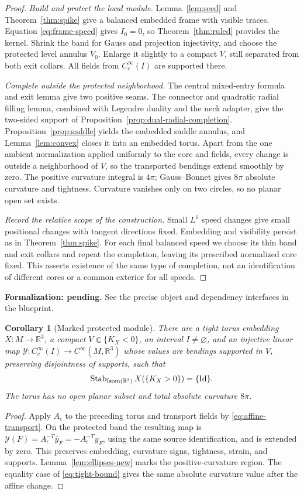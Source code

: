 \documentclass[11pt]{amsart}
\newtheorem{corollary}[theorem]{Corollary}
\theoremstyle{definition}
\theoremstyle{remark}
\newcommand{\R}{\mathbb R}\newcommand{\Sph}{\mathbb S}
\DeclareMathOperator{\Isom}{Isom}\DeclareMathOperator{\Emb}{Emb}
\numberwithin{equation}{section}
\begin{document}
\begin{proof}
\emph{Build and protect the local module.}
Lemma~\ref{lem:seed} and Theorem~\ref{thm:spike} give a balanced embedded
frame with visible traces. Equation \eqref{eq:frame-speed} gives $I_0=0$,
so Theorem~\ref{thm:ruled} provides the kernel. Shrink the band for Gauss
and projection injectivity, and choose the protected level annulus $V_0$.
Enlarge it slightly to a compact $V$, still separated from both exit
collars. All fields from $C_c^\infty(I)$ are supported there.

\emph{Complete outside the protected neighborhood.}
The central mixed-entry formula and exit lemma give two positive seams.
The connector and quadratic radial filling lemma, combined with
Legendre duality and the neck adapter, give the two-sided support
of Proposition~\ref{prop:dual-radial-completion}.
Proposition~\ref{prop:saddle} yields the embedded saddle annulus, and
Lemma~\ref{lem:convex} closes it into an embedded torus. Apart from the
one ambient normalization applied uniformly to the core and fields,
every change is outside a neighborhood of $V$, so the transported
bendings extend smoothly by zero.
The positive curvature integral is $4\pi$; Gauss--Bonnet gives $8\pi$
absolute curvature and tightness. Curvature vanishes only on two circles,
so no planar open set exists.

\emph{Record the relative scope of the construction.}
Small $L^1$ speed changes give small positional changes with tangent
directions fixed. Embedding and visibility persist as in
Theorem~\ref{thm:spike}. For each final balanced speed we choose its thin
band and exit collars and repeat the completion, leaving its prescribed
normalized core fixed. This asserts existence of the same type of completion, not
an identification of different cores or a common exterior for all speeds.
\end{proof}

\par\noindent\textbf{Formalization: pending.} See the precise object and dependency interfaces in the blueprint.\par
\begin{corollary}[Marked protected module]\label{cor:marked-module}
There are a tight torus embedding $X:M\to\R^3$, a compact
$V\Subset\{K_X<0\}$, an interval $I\ne\varnothing$, and an injective
linear map $\mathcal Y:C_c^\infty(I)\to C^\infty(M,\R^3)$ whose values
are bendings supported in $V$, preserving disjointness of supports, such
that
\[
 \Stab_{\Isom(\R^3)}X(\{K_X>0\})=\{\Id\}.
\]
The torus has no open planar subset and total absolute curvature $8\pi$.
\end{corollary}
\begin{proof}
Apply $A_\epsilon$ to the preceding torus and transport fields by
\eqref{eq:affine-transport}. On the protected band the resulting map is
$\mathcal Y(F)=A_\epsilon^{-T}\bar y_F=-A_\epsilon^{-T}y_F$,
using the same source identification, and is extended by zero.
This preserves embedding, curvature signs,
tightness, strain, and supports. Lemma~\ref{lem:ellipses-new} marks the
positive-curvature region. The equality case of \eqref{eq:tight-bound}
gives the same absolute curvature value after the affine change.
\end{proof}
\end{document}

